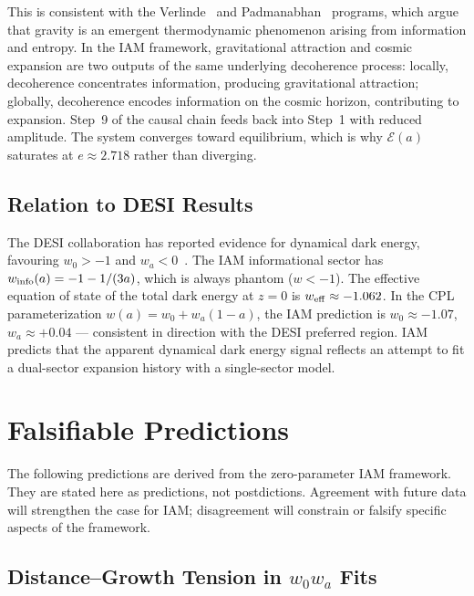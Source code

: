 \documentclass[twocolumn,a4paper,aps,prd,twocolumn,showpacs,notitlepage,superscriptaddress,nofootinbib]{article}
\begin{document}
This is consistent with the Verlinde~\citep{Verlinde2011} and
Padmanabhan~\citep{Padmanabhan2010} programs, which argue that gravity is an
emergent thermodynamic phenomenon arising from information and entropy.  In the
IAM framework, gravitational attraction and cosmic expansion are two outputs
of the same underlying decoherence process: locally, decoherence concentrates
information, producing gravitational attraction; globally, decoherence encodes
information on the cosmic horizon, contributing to expansion.  Step~9 of the
causal chain feeds back into Step~1 with reduced amplitude.  The system
converges toward equilibrium, which is why $\mathcal{E}(a)$ saturates at
$e \approx 2.718$ rather than diverging.

\subsection{Relation to DESI Results}

The DESI collaboration has reported evidence for dynamical dark energy,
favouring $w_0 > -1$ and $w_a < 0$~\citep{DESI2025}.  The IAM informational
sector has $w_{\rm info}(a) = -1 - 1/(3a)$, which is always phantom
($w < -1$).  The effective equation of state of the total dark energy at
$z=0$ is $w_{\rm eff} \approx -1.062$.  In the CPL parameterization
$w(a) = w_0 + w_a(1-a)$, the IAM prediction is $w_0 \approx -1.07$,
$w_a \approx +0.04$ — consistent in direction with the DESI preferred region.
IAM predicts that the apparent dynamical dark energy signal reflects an attempt
to fit a dual-sector expansion history with a single-sector model.

\section{Falsifiable Predictions}
\label{sec:predictions}

The following predictions are derived from the zero-parameter IAM framework.
They are stated here as predictions, not postdictions.  Agreement with future
data will strengthen the case for IAM; disagreement will constrain or falsify
specific aspects of the framework.

\subsection{Distance--Growth Tension in $w_0w_a$ Fits}
\end{document}
